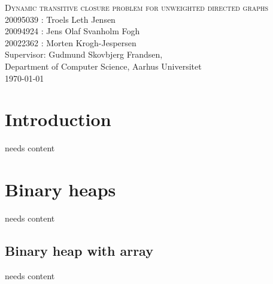 \documentclass[12pt,a4paper,twoside,danish,article]{article}
\begin{document}
\frontmatter
\begin{titlingpage}
  \begin{center}
    \mbox{}\vfill
    \Huge{\textsc{Dynamic transitive closure problem for unweighted directed graphs}} \\
    \vspace{3cm}
    \Large{20095039 : Troels Leth Jensen \\ 20094924 : Jens Olaf Svanholm Fogh \\ 20022362 : Morten Krogh-Jespersen}\\
    \vspace{10cm}
    \vspace{1cm}
    Supervisor: Gudmund Skovbjerg Frandsen,\\ Department of Computer Science, Aarhus Universitet\\
    \today
    \vfill
    \vfill\mbox{}
  \tableofcontents*
  \end{center}
\end{titlingpage}

\mainmatter

\raggedbottom

\renewcommand{\labelitemi}{$\bullet$}

\renewcommand{\baselinestretch}{1.2}\normalsize %

\renewcommand{\chaptermark}[1]{\markboth{\thechapter.
    #1}{\thechapter. #1}} %
\renewcommand{\bibmark}{\markboth{\bibname}{\bibname}} %
\renewcommand{\tocmark}{\markboth{\contentsname}{\contentsname}}

\setlength{\parindent}{10pt} 


\chapter{Introduction}

needs content

\chapter{Binary heaps}

needs content

\section{Binary heap with array}

needs content
\end{document}
